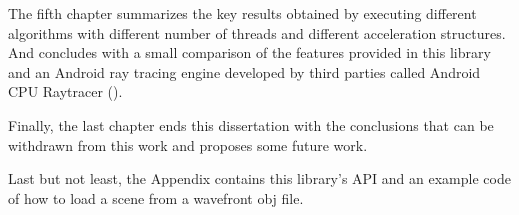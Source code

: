 \par
The fifth chapter summarizes the key results obtained by executing different algorithms with different number of threads and different acceleration structures.
And concludes with a small comparison of the features provided in this library and an Android ray tracing engine developed by third parties called Android CPU Raytracer (\cite{Android_CPU_Raytracer}).

\par
Finally, the last chapter ends this dissertation with the conclusions that can be withdrawn from this work and proposes some future work.

\par
Last but not least, the Appendix contains this library's API and an example code of how to load a scene from a wavefront obj file.